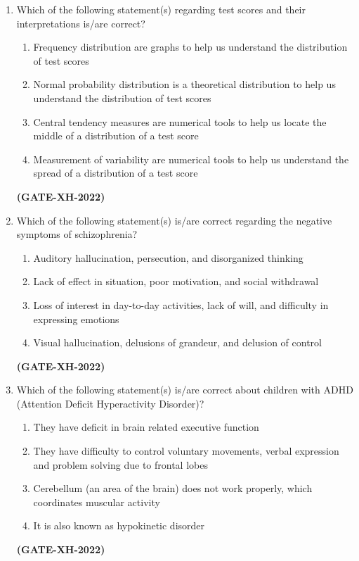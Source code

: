 \documentclass[journal]{IEEEtran}
\begin{document}
\begin{enumerate}
\item
Which of the following statement(s) regarding test scores and their interpretations is/are correct? 
\begin{enumerate}
\item Frequency distribution are graphs to help us understand the distribution of test scores 
\item Normal probability distribution is a theoretical distribution to help us understand the distribution of test scores 
\item Central tendency measures are numerical tools to help us locate the middle of a distribution of a test score 
\item Measurement of variability are numerical tools to help us understand the spread of a distribution of a test score 
\end{enumerate}
\hfill\textbf{(GATE-XH-2022)}

\item
Which of the following statement(s) is/are correct regarding the negative symptoms of schizophrenia? 
\begin{enumerate}
\item Auditory hallucination, persecution, and disorganized thinking 
\item Lack of effect in situation, poor motivation, and social withdrawal  
\item Loss of interest in day-to-day activities, lack of will, and difficulty in expressing emotions 
\item Visual hallucination, delusions of grandeur, and delusion of control
\end{enumerate}
\hfill\textbf{(GATE-XH-2022)}

\item
Which of the following statement(s) is/are correct about children with ADHD (Attention Deficit Hyperactivity Disorder)?
\begin{enumerate}
\item They have deficit in brain related executive function 
\item They have difficulty to control voluntary movements, verbal expression and problem solving due to frontal lobes  
\item Cerebellum (an area of the brain) does not work properly, which coordinates muscular activity 
\item It is also known as hypokinetic disorder 
\end{enumerate}
\hfill\textbf{(GATE-XH-2022)}


\end{enumerate}
\end{document}
